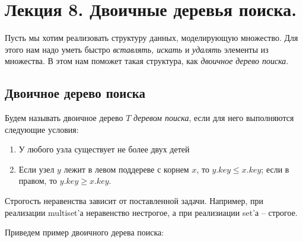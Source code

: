 \documentclass[../main.tex]{subfiles}
\begin{document}
	\section{Лекция 8. Двоичные деревья поиска.}
	
	Пусть мы хотим реализовать структуру данных, моделирующую множество. Для этого нам надо уметь быстро \textit{вставлять, искать} и \textit{удалять} элементы из множества. В этом нам поможет такая структура, как \textit{двоичное дерево поиска}.
	
	\subsection{Двоичное дерево поиска}
	
	Будем называть двоичное дерево $T$ \textit{деревом поиска}, если для него выполняются следующие условия:
	\begin{enumerate}
		\item У любого узла существует не более двух детей
		\item Если узел $y$ лежит в левом поддереве с корнем $x$, то $y.key \leqslant x.key$; если в правом, то $y.key \geqslant x.key$.
	\end{enumerate}

	\begin{remark}
		Строгость неравенства зависит от поставленной задачи. Например, при реализации multiset'а неравенство нестрогое, а при реализиации set'а -- строгое.
	\end{remark}
	
	Приведем пример двоичного дерева поиска:
	
		
		
		
		
		
		
\end{document}
